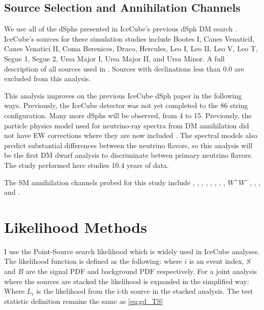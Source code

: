 \subsection{Source Selection and Annihilation Channels}\label{sec:ic3_study_selection}

We use all of the dSphs presented in IceCube's previous dSph DM search \cite{IC3_DM2013}.
IceCube's sources for these simulation studies include Bootes I, Canes VenaticiI, Canes Venatici II, Coma Berenices, Draco, Hercules, Leo I, Leo II, Leo V, Leo T, Segue 1, Segue 2, Ursa Major I, Ursa Major II,  and Ursa Minor.
A full description of all sources used in .
Sources with declinations less than 0.0 are excluded from this analysis.

This analysis improves on the previous IceCube dSph paper \cite{IC3_DM2013} in the following ways.
Previously, the IceCube detector was not yet completed to the 86 string configuration.
Many more dSphs will be observed, from 4 to 15.
Previously, the particle physics model used for neutrino-ray spectra from DM annihilation did not have EW corrections where they are now included \cite{HDMSpectra}.
The spectral models also predict substantial differences between the neutrino flavors, so this analysis will be the first DM dwarf analysis to discriminate betwen primary neutrino flavors.
The study performed here studies 10.4 years of data.

The SM annihilation channels probed for this study include , , , , , \parpar{\mu}, \parpar{\tau}, , $W^+W^-$, , \parpar{\nu_\mu}, and \parpar{\nu_\tau}.

\section{Likelihood Methods}\label{sec:icDM_LLH}

I use the Point-Source search likelihood which is widely used in IceCube analyses.
The likelihood function is defined as the following:
\icPtSrcLLH
where  $ i $ is an event index, $S$ and $B$ are the signal PDF and background PDF respectively. For a joint analysis where the sources are stacked the likelihood is expanded in the simplified way:
\icStackLLH
Where $ L_i $ is the likelihood from the i-th source in the stacked analysis.
The test statistic definition remains the same as \cref{eq:gd_TS}


